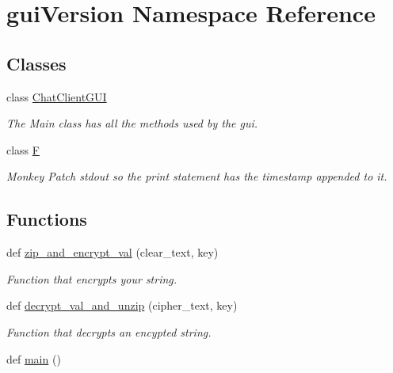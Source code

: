 \hypertarget{namespacegui_version}{}\section{gui\+Version Namespace Reference}
\label{namespacegui_version}
\subsection*{Classes}
\begin{DoxyCompactItemize}
\item 
class \hyperlink{classgui_version_1_1_chat_client_g_u_i}{Chat\+Client\+G\+U\+I}
\begin{DoxyCompactList}\small\item\em The Main class has all the methods used by the gui. \end{DoxyCompactList}\item 
class \hyperlink{classgui_version_1_1_f}{F}
\begin{DoxyCompactList}\small\item\em Monkey Patch stdout so the print statement has the timestamp appended to it. \end{DoxyCompactList}\end{DoxyCompactItemize}
\subsection*{Functions}
\begin{DoxyCompactItemize}
\item 
def \hyperlink{namespacegui_version_ae8a9c77879e18f58a45597b28e21042b}{zip\+\_\+and\+\_\+encrypt\+\_\+val} (clear\+\_\+text, key)
\begin{DoxyCompactList}\small\item\em Function that encrypts your string. \end{DoxyCompactList}\item 
def \hyperlink{namespacegui_version_a2925a99a40df97be6ae16f1a22184b24}{decrypt\+\_\+val\+\_\+and\+\_\+unzip} (cipher\+\_\+text, key)
\begin{DoxyCompactList}\small\item\em Function that decrypts an encypted string. \end{DoxyCompactList}\item 
def \hyperlink{namespacegui_version_a79d3b927a5ac9c40a255afc12ebfa5bb}{main} ()
\end{DoxyCompactItemize}
